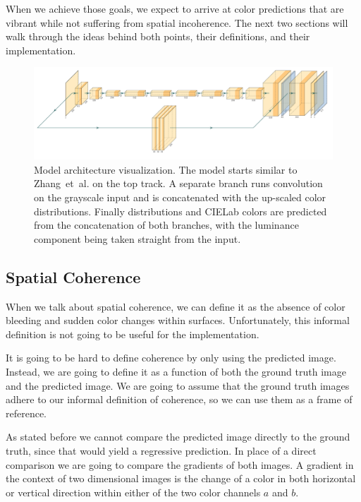 \documentclass[11pt]{article}
\begin{document}
When we achieve those goals, we expect to arrive at color predictions that are vibrant while not suffering from spatial incoherence. The next two sections will walk through the ideas behind both points, their definitions, and their implementation.

\begin{figure}[tbp]
    \includegraphics[width=\textwidth]{latex/architecture.pdf}
    \caption{Model architecture visualization. The model starts similar to  Zhang~et~al.\cite{zhang2016colorful} on the top track. A separate branch runs convolution on the grayscale input and is concatenated with the up-scaled color distributions. Finally distributions and CIELab colors are predicted from the concatenation of both branches, with the luminance component being taken straight from the input.}
    \label{fig:architecture}
\end{figure}

\subsection{Spatial Coherence}
\label{chap:coherence}

When we talk about spatial coherence, we can define it as the absence of color bleeding and sudden color changes within surfaces. Unfortunately, this informal definition is not going to be useful for the implementation.

It is going to be hard to define coherence by only using the predicted image. Instead, we are going to define it as a function of both the ground truth image and the predicted image. We are going to assume that the ground truth images adhere to our informal definition of coherence, so we can use them as a frame of reference.

As stated before we cannot compare the predicted image directly to the ground truth, since that would yield a regressive prediction. In place of a direct comparison we are going to compare the gradients of both images. A gradient in the context of two dimensional images is the change of a color in both horizontal or vertical direction within either of the two color channels $a$ and $b$.
\end{document}
